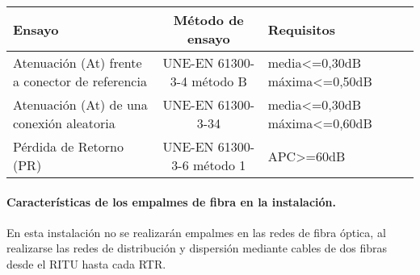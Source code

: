 \begin{tabular}{| p{4cm}| c | p{3cm} |}
	\hline
	Ensayo & Método de ensayo & Requisitos \\
	\hline
	Atenuación (At) frente a conector de referencia & UNE-EN 61300-3-4 método B & media<=0,30dB máxima<=0,50dB \\
	\hline
	Atenuación (At) de una conexión aleatoria & UNE-EN 61300-3-34 & media<=0,30dB máxima<=0,60dB\\
	\hline
	Pérdida de Retorno (PR) & UNE-EN 61300-3-6 método 1 & APC>=60dB\\
	\hline
\end{tabular}
\paragraph{Características de los empalmes de fibra en la instalación.}
En esta instalación no se realizarán empalmes en las redes de fibra óptica, al realizarse las redes de distribución y dispersión mediante cables de dos fibras desde el RITU hasta cada RTR.
